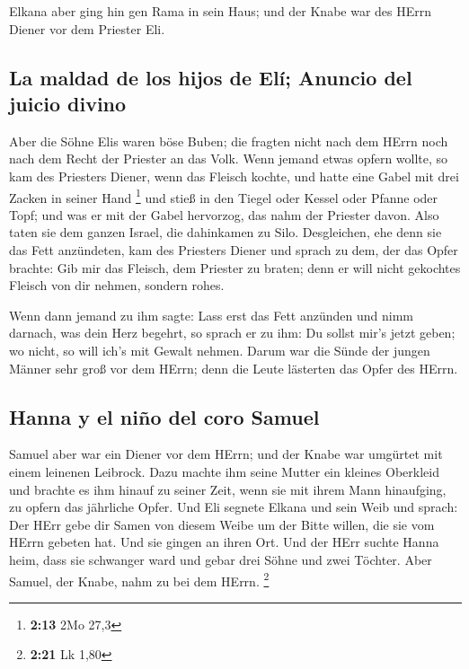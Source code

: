  Elkana aber ging hin gen Rama in sein Haus; und der
Knabe war des HErrn Diener vor dem Priester Eli.

\hypertarget{la-maldad-de-los-hijos-de-eluxed-anuncio-del-juicio-divino}{%
\subsection{La maldad de los hijos de Elí; Anuncio del juicio
divino}\label{la-maldad-de-los-hijos-de-eluxed-anuncio-del-juicio-divino}}

 Aber die Söhne Elis waren böse Buben; die fragten nicht
nach dem HErrn  noch nach dem Recht der Priester an das
Volk. Wenn jemand etwas opfern wollte, so kam des Priesters Diener, wenn
das Fleisch kochte, und hatte eine Gabel mit drei Zacken in seiner Hand
\footnote{\textbf{2:13} 2Mo 27,3}  und stieß in den
Tiegel oder Kessel oder Pfanne oder Topf; und was er mit der Gabel
hervorzog, das nahm der Priester davon. Also taten sie dem ganzen
Israel, die dahinkamen zu Silo.  Desgleichen, ehe denn
sie das Fett anzündeten, kam des Priesters Diener und sprach zu dem, der
das Opfer brachte: Gib mir das Fleisch, dem Priester zu braten; denn er
will nicht gekochtes Fleisch von dir nehmen, sondern rohes.

 Wenn dann jemand zu ihm sagte: Lass erst das Fett
anzünden und nimm darnach, was dein Herz begehrt, so sprach er zu ihm:
Du sollst mir's jetzt geben; wo nicht, so will ich's mit Gewalt nehmen.
 Darum war die Sünde der jungen Männer sehr groß vor dem
HErrn; denn die Leute lästerten das Opfer des HErrn.

\hypertarget{hanna-y-el-niuxf1o-del-coro-samuel}{%
\subsection{Hanna y el niño del coro
Samuel}\label{hanna-y-el-niuxf1o-del-coro-samuel}}

 Samuel aber war ein Diener vor dem HErrn; und der Knabe
war umgürtet mit einem leinenen Leibrock.  Dazu machte
ihm seine Mutter ein kleines Oberkleid und brachte es ihm hinauf zu
seiner Zeit, wenn sie mit ihrem Mann hinaufging, zu opfern das jährliche
Opfer.  Und Eli segnete Elkana und sein Weib und sprach:
Der HErr gebe dir Samen von diesem Weibe um der Bitte willen, die sie
vom HErrn gebeten hat. Und sie gingen an ihren Ort.  Und
der HErr suchte Hanna heim, dass sie schwanger ward und gebar drei Söhne
und zwei Töchter. Aber Samuel, der Knabe, nahm zu bei dem HErrn.
\footnote{\textbf{2:21} Lk 1,80}

